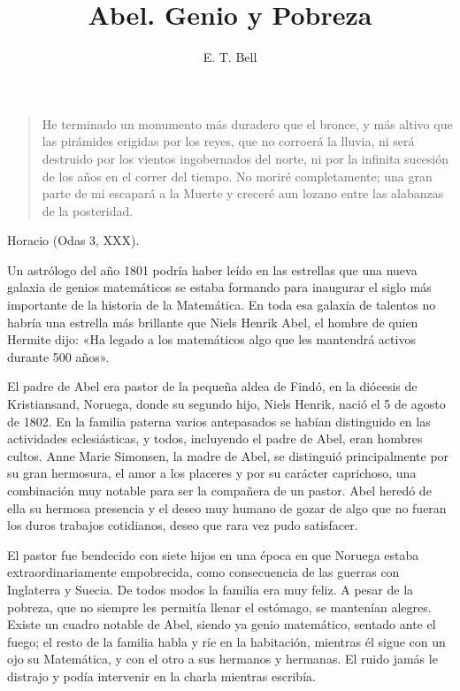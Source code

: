\documentclass[a4paper, 12pt, draft]{article}
\title{Abel. Genio y Pobreza}
\author{E. T. Bell}
\date{}
\begin{document}
\begin{tcolorbox}[colback=blue!5!white,colframe=blue!75!black]

\vspace{-1.8cm}
\textbf \maketitle

\end{tcolorbox}

\bigskip


\begin{quote} \it

He terminado un monumento más duradero que el bronce, y más altivo que las pirámides erigidas por los reyes, que no corroerá la lluvia, ni será destruido por los vientos ingobernados del norte, ni por la infinita sucesión de los años en el correr del tiempo. No moriré completamente; una gran parte de mi escapará a la Muerte y creceré aun lozano entre las alabanzas de la posteridad.


\end{quote}


\hfill Horacio (Odas 3, XXX).

\bigskip

Un astrólogo del año 1801 podría haber leído en las estrellas que una nueva galaxia de genios matemáticos se estaba formando para inaugurar el siglo más importante de la historia de la Matemática. En toda esa galaxia de talentos no habría una estrella más brillante que Niels Henrik Abel, el hombre de quien Hermite dijo: «Ha legado a los matemáticos algo que les mantendrá activos durante 500 años».

El padre de Abel era pastor de la pequeña aldea de Findó, en la diócesis de Kristiansand, Noruega, donde su segundo hijo, Niels Henrik, nació el 5 de agosto de 1802. En la familia paterna varios antepasados se habían distinguido en las actividades eclesiásticas, y todos, incluyendo el padre de Abel, eran hombres cultos. Anne Marie Simonsen, la madre de Abel, se distinguió principalmente por su gran hermosura, el amor a los placeres y por su carácter caprichoso, una combinación muy notable para ser la compañera de un pastor. Abel heredó de ella su hermosa presencia y el deseo muy humano de gozar de algo que no fueran los duros trabajos cotidianos, deseo que rara vez pudo satisfacer.

El pastor fue bendecido con siete hijos en una época en que Noruega estaba extraordinariamente empobrecida, como consecuencia de las guerras con Inglaterra y Suecia. De todos modos la familia era muy feliz. A pesar de la pobreza, que no siempre les permitía llenar el estómago, se mantenían alegres. Existe un cuadro notable de Abel, siendo ya genio matemático, sentado ante el fuego; el resto de la familia habla y ríe en la habitación, mientras él sigue con un ojo su Matemática, y con el otro a sus hermanos y hermanas. El ruido jamás le distrajo y podía intervenir en la charla mientras escribía.
\end{document}
